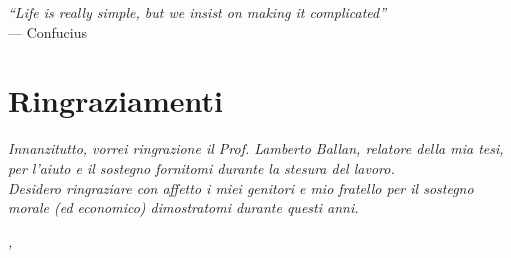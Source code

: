 
\cleardoublepage
{}
{}
\begin{flushright}{
	\slshape    
	``Life is really simple, but we insist on making it complicated''} \\ 
	\medskip
    --- Confucius
\end{flushright}


\bigskip

\begingroup
\let\clearpage\relax
\let\cleardoublepage\relax
\let\cleardoublepage\relax

\chapter*{Ringraziamenti}

\noindent \textit{Innanzitutto, vorrei ringrazione il Prof. Lamberto Ballan, relatore della mia tesi, per l'aiuto e il sostegno fornitomi durante la stesura del lavoro.}\\

\noindent \textit{Desidero ringraziare con affetto i miei genitori e mio fratello per il sostegno morale (ed economico) dimostratomi durante questi anni.}\\

\bigskip

\noindent\textit{\myLocation, \myTime}
\hfill \myName

\endgroup

